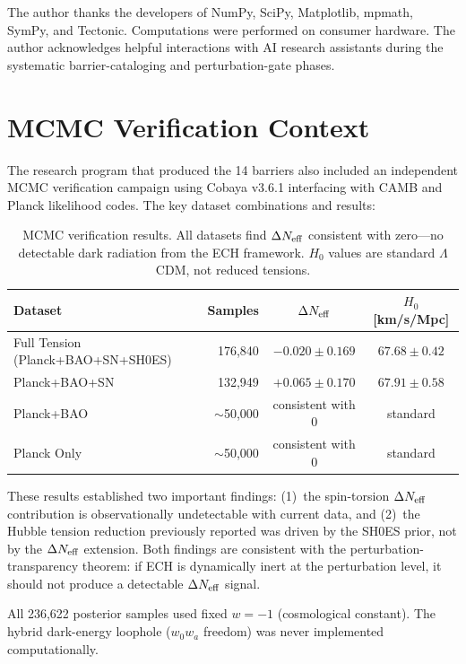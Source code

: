 \documentclass[a4paper,11pt]{article}
\begin{document}
The author thanks the developers of NumPy, SciPy, Matplotlib, mpmath, SymPy, and Tectonic. Computations were performed on consumer hardware. The author acknowledges helpful interactions with AI research assistants during the systematic barrier-cataloging and perturbation-gate phases.

\appendix

\section{MCMC Verification Context}
\label{app:mcmc}

The research program that produced the 14 barriers also included an independent MCMC verification campaign using Cobaya v3.6.1 interfacing with CAMB and Planck likelihood codes. The key dataset combinations and results:

\begin{table}[h]
\centering
\small
\begin{tabular}{lrcc}
\toprule
Dataset & Samples & $\Delta N_{\rm eff}$ & $H_0$ [km/s/Mpc] \\
\midrule
Full Tension (Planck+BAO+SN+SH0ES) & 176{,}840 & $-0.020 \pm 0.169$ & $67.68 \pm 0.42$ \\
Planck+BAO+SN & 132{,}949 & $+0.065 \pm 0.170$ & $67.91 \pm 0.58$ \\
Planck+BAO & $\sim$50{,}000 & consistent with 0 & standard \\
Planck Only & $\sim$50{,}000 & consistent with 0 & standard \\
\bottomrule
\end{tabular}
\caption{MCMC verification results. All datasets find $\Delta N_{\rm eff}$ consistent with zero---no detectable dark radiation from the ECH framework. $H_0$ values are standard $\Lambda$CDM, not reduced tensions.}
\label{tab:mcmc}
\end{table}

These results established two important findings: (1)~the spin-torsion $\Delta N_{\rm eff}$ contribution is observationally undetectable with current data, and (2)~the Hubble tension reduction previously reported was driven by the SH0ES prior, not by the $\Delta N_{\rm eff}$ extension. Both findings are consistent with the perturbation-transparency theorem: if ECH is dynamically inert at the perturbation level, it should not produce a detectable $\Delta N_{\rm eff}$ signal.

All 236{,}622 posterior samples used fixed $w = -1$ (cosmological constant). The hybrid dark-energy loophole ($w_0w_a$ freedom) was never implemented computationally.
\end{document}
